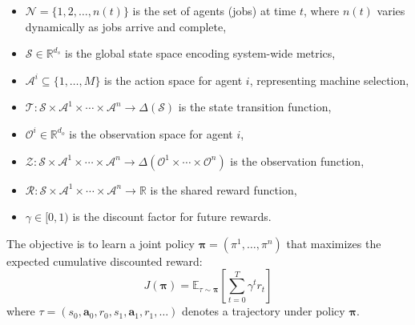 \begin{itemize}
    \item \( \mathcal{N} = \{1, 2, \ldots, n(t)\} \) is the set of agents (jobs) at time \( t \), where \( n(t) \) varies dynamically as jobs arrive and complete,
    
    \item \( \mathcal{S} \in \mathbb{R}^{d_s} \) is the global state space encoding system-wide metrics,
    
    \item \( \mathcal{A}^i \subseteq \{1, \ldots, M\} \) is the action space for agent \( i \), representing machine selection,
    
    \item \( \mathcal{T}: \mathcal{S} \times \mathcal{A}^1 \times \cdots \times \mathcal{A}^n \rightarrow \Delta(\mathcal{S}) \) is the state transition function,
    
    \item \( \mathcal{O}^i \in \mathbb{R}^{d_o} \) is the observation space for agent \( i \),
    
    \item \( \mathcal{Z}: \mathcal{S} \times \mathcal{A}^1 \times \cdots \times \mathcal{A}^n \rightarrow \Delta(\mathcal{O}^1 \times \cdots \times \mathcal{O}^n) \) is the observation function,
    
    \item \( \mathcal{R}: \mathcal{S} \times \mathcal{A}^1 \times \cdots \times \mathcal{A}^n \rightarrow \mathbb{R} \) is the shared reward function,
    
    \item \( \gamma \in [0,1) \) is the discount factor for future rewards.
\end{itemize}

The objective is to learn a joint policy \( \boldsymbol{\pi} = (\pi^1, \ldots, \pi^n) \) that maximizes the expected cumulative discounted reward:
\[
J(\boldsymbol{\pi}) = \mathbb{E}_{\tau \sim \boldsymbol{\pi}} \left[ \sum_{t=0}^{T} \gamma^t r_t \right]
\]
where \( \tau = (s_0, \mathbf{a}_0, r_0, s_1, \mathbf{a}_1, r_1, \ldots) \) denotes a trajectory under policy \( \boldsymbol{\pi} \).

